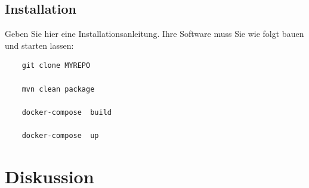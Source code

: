 \documentclass[fleqn,10pt,ngerman]{SelfArx}
\begin{document}
	
	
	\subsection{Installation}
	Geben Sie hier eine Installationsanleitung. Ihre Software muss Sie wie folgt bauen und starten lassen: 
	
	\begin{lstlisting}
	git clone MYREPO
	
	mvn clean package
	
	docker-compose  build 
	
	docker-compose  up
	\end{lstlisting}
	
	
	
	\section{Diskussion}
	
\end{document}

